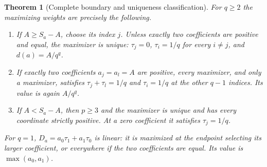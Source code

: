 \documentclass[11pt]{article}
\newtheorem{theorem}{Theorem}[section]
\begin{document}
\begin{theorem}[Complete boundary and uniqueness classification]
For $q\ge2$ the maximizing weights are precisely the following.
\begin{enumerate}
\item If $A\ge S_a-A$, choose its index $j$. Unless exactly two
coefficients are positive and equal, the maximizer is unique:
$\tau_j=0$, $\tau_i=1/q$ for every $i\ne j$, and
$d(a)=A/q^q$.
\item If exactly two coefficients $a_j=a_l=A$ are positive, every
maximizer, and only a maximizer, satisfies
$\tau_j+\tau_l=1/q$ and $\tau_i=1/q$ at the other $q-1$ indices.
Its value is again $A/q^q$.
\item If $A<S_a-A$, then $p\ge3$ and the maximizer is unique and
has every coordinate strictly positive. At a zero coefficient it
satisfies $\tau_j=1/q$.
\end{enumerate}
For $q=1$, $D_a=a_0\tau_1+a_1\tau_0$ is linear: it is maximized
at the endpoint selecting its larger coefficient, or everywhere if
the two coefficients are equal. Its value is $\max(a_0,a_1)$.
\end{theorem}
\end{document}
